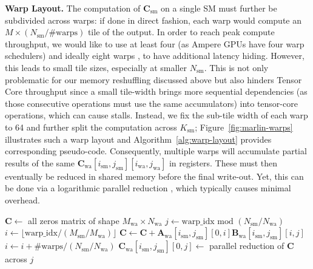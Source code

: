 \documentclass{article}
\theoremstyle{plain}
\theoremstyle{definition}
\theoremstyle{remark}
\renewcommand{\paragraph}[1]{\vspace{0.1em}\noindent\textbf{#1}}
\begin{document}
\paragraph{Warp Layout.}
The computation of $\textbf{C}_\text{sm}$ on a single SM must further be subdivided across warps: if done in direct fashion, each warp would compute an $M \times (N_\text{sm} / \text{\#warps})$ tile of the output. In order to reach peak compute throughput, we would like to use at least four (as Ampere GPUs have four warp schedulers) and ideally eight warps \cite{sun2022dissecting}, to have additional latency hiding. However, this leads to small tile sizes, especially at smaller $N_\text{sm}$. This is not only problematic for our memory reshuffling discussed above but also hinders Tensor Core throughput since a small tile-width brings more sequential dependencies (as those consecutive operations must use the same accumulators) into tensor-core operations, which can cause stalls. Instead, we fix the sub-tile width of each warp to 64 and further split the computation across $K_\text{sm}$; Figure~\ref{fig:marlin-warps} illustrates such a warp layout and Algorithm~\ref{alg:warp-layout} provides corresponding pseudo-code. Consequently, multiple warps will accumulate partial results of the same $\mathbf{C}_\text{wa}[i_\text{sm}, j_\text{sm}][i_\text{wa}, j_\text{wa}]$ in registers. These must then eventually be reduced in shared memory before the final write-out. Yet, this can be done via a logarithmic parallel reduction \cite{harris2007optimizing}, which typically causes minimal overhead.

\begin{algorithm}
    \centering
    \caption{Warp reduction within a corresponding $\mathbf{C}_\text{sm}[i_\text{sm}, j_\text{sm}]$ sub-problem. The following pseudo-code is executed by all warps, identified via ``warp\_idx''.}
    \begin{algorithmic}
        \STATE $\mathbf{C} \gets$ all zeros matrix of shape $M_\text{wa} \times N_\text{wa}$
        \STATE $j \gets \text{warp\_idx} \,\, \text{mod} \,\, (N_\text{sm} / N_\text{wa})$
            \STATE $i \gets \lfloor \text{warp\_idx} / (M_\text{sm} / M_\text{wa}) \rfloor$
                \STATE $\mathbf{C} \gets \mathbf{C} + \mathbf{A}_\text{wa}[i_\text{sm}, j_\text{sm}][0, i] \mathbf{B}_\text{wa}[i_\text{sm}, j_\text{sm}][i, j]$
                \STATE $i \gets i + \text{\#warps} / (N_\text{sm} / N_\text{wa})$
            \ENDWHILE
        \ENDFOR
        \STATE $\mathbf{C}_\text{wa}[i_\text{sm}, j_\text{sm}][0, j] \gets$ parallel reduction of $\mathbf{C}$ across $j$
    \end{algorithmic}
    \label{alg:warp-layout}
\end{algorithm}
\end{document}
